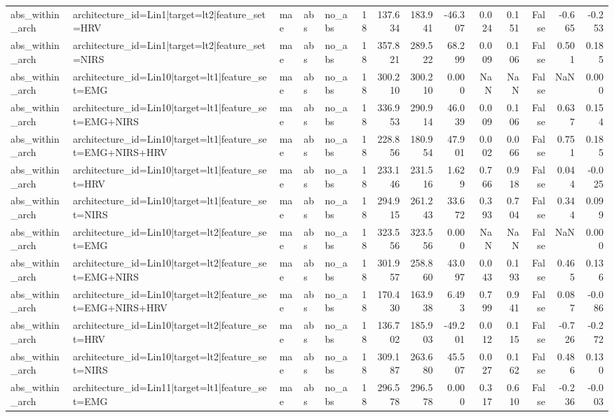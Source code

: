 \begin{table}
\begin{tabular}{lllllrrrrrrrrr}
abs_within_arch & architecture_id=Lin1|target=lt2|feature_set=HRV & mae & abs & no_abs & 18 & 137.634 & 183.941 & -46.307 & 0.024 & 0.151 & False & -0.665 & -0.253 \\
abs_within_arch & architecture_id=Lin1|target=lt2|feature_set=NIRS & mae & abs & no_abs & 18 & 357.821 & 289.522 & 68.299 & 0.009 & 0.106 & False & 0.501 & 0.185 \\
abs_within_arch & architecture_id=Lin10|target=lt1|feature_set=EMG & mae & abs & no_abs & 18 & 300.210 & 300.210 & 0.000 & NaN & NaN & False & NaN & 0.000 \\
abs_within_arch & architecture_id=Lin10|target=lt1|feature_set=EMG+NIRS & mae & abs & no_abs & 18 & 336.953 & 290.914 & 46.039 & 0.009 & 0.106 & False & 0.637 & 0.154 \\
abs_within_arch & architecture_id=Lin10|target=lt1|feature_set=EMG+NIRS+HRV & mae & abs & no_abs & 18 & 228.856 & 180.954 & 47.901 & 0.002 & 0.066 & False & 0.751 & 0.185 \\
abs_within_arch & architecture_id=Lin10|target=lt1|feature_set=HRV & mae & abs & no_abs & 18 & 233.146 & 231.516 & 1.629 & 0.766 & 0.918 & False & 0.044 & -0.025 \\
abs_within_arch & architecture_id=Lin10|target=lt1|feature_set=NIRS & mae & abs & no_abs & 18 & 294.915 & 261.243 & 33.672 & 0.393 & 0.704 & False & 0.344 & 0.099 \\
abs_within_arch & architecture_id=Lin10|target=lt2|feature_set=EMG & mae & abs & no_abs & 18 & 323.556 & 323.556 & 0.000 & NaN & NaN & False & NaN & 0.000 \\
abs_within_arch & architecture_id=Lin10|target=lt2|feature_set=EMG+NIRS & mae & abs & no_abs & 18 & 301.957 & 258.860 & 43.097 & 0.043 & 0.193 & False & 0.465 & 0.136 \\
abs_within_arch & architecture_id=Lin10|target=lt2|feature_set=EMG+NIRS+HRV & mae & abs & no_abs & 18 & 170.430 & 163.938 & 6.493 & 0.799 & 0.941 & False & 0.087 & -0.086 \\
abs_within_arch & architecture_id=Lin10|target=lt2|feature_set=HRV & mae & abs & no_abs & 18 & 136.702 & 185.903 & -49.201 & 0.012 & 0.115 & False & -0.726 & -0.272 \\
abs_within_arch & architecture_id=Lin10|target=lt2|feature_set=NIRS & mae & abs & no_abs & 18 & 309.187 & 263.680 & 45.507 & 0.027 & 0.162 & False & 0.486 & 0.130 \\
abs_within_arch & architecture_id=Lin11|target=lt1|feature_set=EMG & mae & abs & no_abs & 18 & 296.578 & 296.578 & 0.000 & 0.317 & 0.610 & False & -0.236 & -0.003 \\

\end{tabular}
\end{table}
